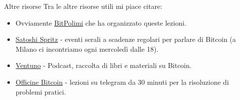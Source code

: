 \begin{frame}{Altre risorse} 
Tra le altre risorse utili mi piace citare:
    \begin{itemize}
        \item Ovviamente \href{https://t.me/BitPolimi}{BitPolimi} che ha organizzato queste lezioni.
        \item \href{http://satoshispritz.it}{Satoshi Spritz} - eventi serali a scadenze regolari per parlare di Bitcoin (a Milano ci incontriamo ogni mercoledì dalle 18).
        \item \href{https://t.me/ventunobtc}{Ventuno} - Podcast, raccolta di libri e materiali su Bitcoin.
        \item \href{http://officinebitcoin.it}{Officine Bitcoin} - lezioni su telegram da 30 minuti per la risoluzione di problemi pratici.
    \end{itemize}
\end{frame}

